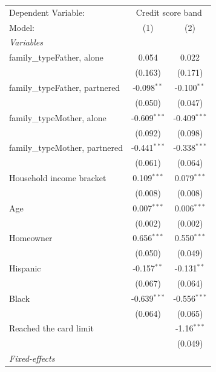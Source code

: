 
\begingroup
\centering
\begin{tabular}{lcc}
   \tabularnewline \midrule \midrule
   Dependent Variable: & \multicolumn{2}{c}{Credit score band}\\
   Model:                         & (1)            & (2)\\  
   \midrule
   \emph{Variables}\\
   family\_typeFather, alone      & 0.054          & 0.022\\   
                                  & (0.163)        & (0.171)\\   
   family\_typeFather, partnered  & -0.098$^{**}$  & -0.100$^{**}$\\   
                                  & (0.050)        & (0.047)\\   
   family\_typeMother, alone      & -0.609$^{***}$ & -0.409$^{***}$\\   
                                  & (0.092)        & (0.098)\\   
   family\_typeMother, partnered  & -0.441$^{***}$ & -0.338$^{***}$\\   
                                  & (0.061)        & (0.064)\\   
   Household income bracket       & 0.109$^{***}$  & 0.079$^{***}$\\   
                                  & (0.008)        & (0.008)\\   
   Age                            & 0.007$^{***}$  & 0.006$^{***}$\\   
                                  & (0.002)        & (0.002)\\   
   Homeowner                      & 0.656$^{***}$  & 0.550$^{***}$\\   
                                  & (0.050)        & (0.049)\\   
   Hispanic                       & -0.157$^{**}$  & -0.131$^{**}$\\   
                                  & (0.067)        & (0.064)\\   
   Black                          & -0.639$^{***}$ & -0.556$^{***}$\\   
                                  & (0.064)        & (0.065)\\   
   Reached the card limit         &                & -1.16$^{***}$\\   
                                  &                & (0.049)\\   
   \midrule
   \emph{Fixed-effects}\\

\end{tabular}
